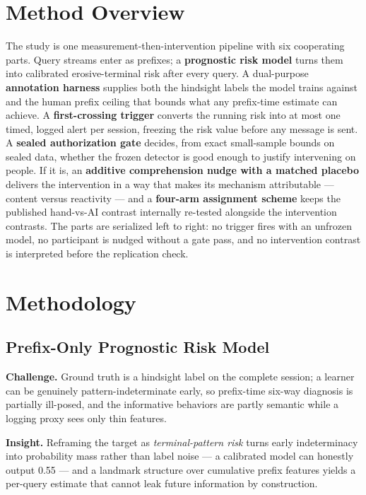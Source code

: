 \documentclass[11pt]{article}
\begin{document}
\section{Method Overview}

The study is one measurement-then-intervention pipeline with six cooperating parts. Query streams enter as prefixes; a \textbf{prognostic risk model} turns them into calibrated erosive-terminal risk after every query. A dual-purpose \textbf{annotation harness} supplies both the hindsight labels the model trains against and the human prefix ceiling that bounds what any prefix-time estimate can achieve. A \textbf{first-crossing trigger} converts the running risk into at most one timed, logged alert per session, freezing the risk value before any message is sent. A \textbf{sealed authorization gate} decides, from exact small-sample bounds on sealed data, whether the frozen detector is good enough to justify intervening on people. If it is, an \textbf{additive comprehension nudge with a matched placebo} delivers the intervention in a way that makes its mechanism attributable --- content versus reactivity --- and a \textbf{four-arm assignment scheme} keeps the published hand-vs-AI contrast internally re-tested alongside the intervention contrasts. The parts are serialized left to right: no trigger fires with an unfrozen model, no participant is nudged without a gate pass, and no intervention contrast is interpreted before the replication check.

\section{Methodology}

\subsection{Prefix-Only Prognostic Risk Model}

\textbf{Challenge.} Ground truth is a hindsight label on the complete session; a learner can be genuinely pattern-indeterminate early, so prefix-time six-way diagnosis is partially ill-posed, and the informative behaviors are partly semantic while a logging proxy sees only thin features.

\textbf{Insight.} Reframing the target as \emph{terminal-pattern risk} turns early indeterminacy into probability mass rather than label noise --- a calibrated model can honestly output 0.55 --- and a landmark structure over cumulative prefix features yields a per-query estimate that cannot leak future information by construction.
\end{document}
